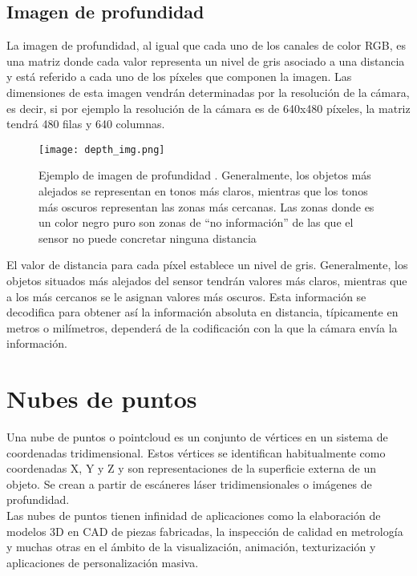 \subsection{Imagen de profundidad}

La imagen de profundidad, al igual que cada uno de los canales de color RGB, es una matriz donde cada valor representa un nivel de gris asociado a una distancia y está referido a cada uno de los píxeles que componen la imagen. Las dimensiones de esta imagen vendrán determinadas por la resolución de la cámara, es decir, si por ejemplo la resolución de la cámara es de 640x480 píxeles, la matriz tendrá 480 filas y 640 columnas. \\

\begin{figure}[H]
	\begin{center} 
		\texttt{[image: depth\_img.png]}
	\end{center}
	\caption{Ejemplo de imagen de profundidad \cite{depthimage}. Generalmente, los objetos más alejados se representan en tonos más claros, mientras que los tonos más oscuros representan las zonas más cercanas. Las zonas donde es un color negro puro son zonas de ``no información'' de las que el sensor no puede concretar ninguna distancia}
	\label{fig:depth}
\end{figure}


El valor de distancia para cada píxel establece un nivel de gris. Generalmente, los objetos situados más alejados del sensor tendrán valores más claros, mientras que a los más cercanos se le asignan valores más oscuros. Esta información se decodifica para obtener así la información absoluta en distancia, típicamente en metros o milímetros, dependerá de la codificación con la que la cámara envía la información.\\

\section{Nubes de puntos}

Una nube de puntos o pointcloud es un conjunto de vértices en un sistema de coordenadas tridimensional. Estos vértices se identifican habitualmente como coordenadas X, Y y Z y son representaciones de la superficie externa de un objeto. Se crean a partir de escáneres láser tridimensionales o imágenes de profundidad.\\

Las nubes de puntos tienen infinidad de aplicaciones como la elaboración de modelos 3D en CAD de piezas fabricadas, la inspección de calidad en metrología y muchas otras en el ámbito de la visualización, animación, texturización y aplicaciones de personalización masiva.\\

